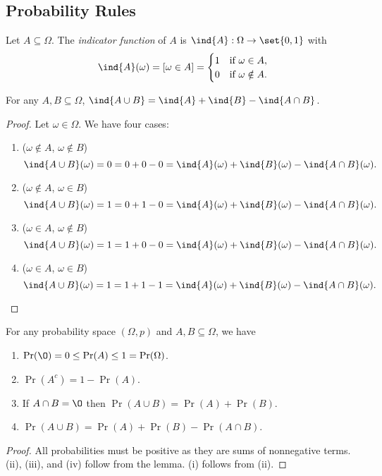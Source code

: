\subsection{Probability Rules} \label{sec:probability_rules}
\begin{definition} \label{def:prob:indicator_function}
    Let $A \subseteq \Omega$.
    The \emph{indicator function} of $A$ is $\ind{A} : \Omega \to \set{0, 1}$ 
    with \[
        \ind{A}(\omega) = [\omega \in A] = \begin{cases}
            1 & \text{if } \omega \in A, \\
            0 & \text{if } \omega \notin A.
        \end{cases}
    \]
\end{definition}
\begin{lemma}
    For any $A, B \subseteq \Omega$, $\ind{A \cup B} = \ind{A} + \ind{B}
    - \ind{A \cap B}$.
\end{lemma}
\begin{proof}
    Let $\omega \in \Omega$.
    We have four cases:
    \begin{enumerate}
        \item ($\omega \notin A$, $\omega \notin B$) \[
            \ind{A \cup B}(\omega) = 0 = 0 + 0 - 0 = \ind{A}(\omega)
            + \ind{B}(\omega) - \ind{A \cap B}(\omega).
        \]
        \item ($\omega \notin A$, $\omega \in B$) \[
            \ind{A \cup B}(\omega) = 1 = 0 + 1 - 0 = \ind{A}(\omega)
            + \ind{B}(\omega) - \ind{A \cap B}(\omega).
        \]
        \item ($\omega \in A$, $\omega \notin B$) \[
            \ind{A \cup B}(\omega) = 1 = 1 + 0 - 0 = \ind{A}(\omega)
            + \ind{B}(\omega) - \ind{A \cap B}(\omega).
        \]
        \item ($\omega \in A$, $\omega \in B$) \[
            \ind{A \cup B}(\omega) = 1 = 1 + 1 - 1 = \ind{A}(\omega)
            + \ind{B}(\omega) - \ind{A \cap B}(\omega). \qedhere
        \]
    \end{enumerate}
\end{proof}
\begin{theorem}
    For any probability space $(\Omega, p)$ and $A, B \subseteq \Omega$,
    we have
    \begin{enumerate}
        \item $\Pr(\O) = 0 \leq \Pr(A) \leq 1 = \Pr(\Omega)$.
        \item $\Pr(A^{c}) = 1 - \Pr(A)$.
        \item If $A \cap B = \O$ then $\Pr(A \cup B) = \Pr(A) + \Pr(B)$.
        \item $\Pr(A \cup B) = \Pr(A) + \Pr(B) - \Pr(A \cap B)$.
    \end{enumerate} 
\end{theorem}
\begin{proof}
    All probabilities must be positive as they are sums of nonnegative terms.
    (ii), (iii), and (iv) follow from the lemma.
    (i) follows from (ii).
\end{proof}
